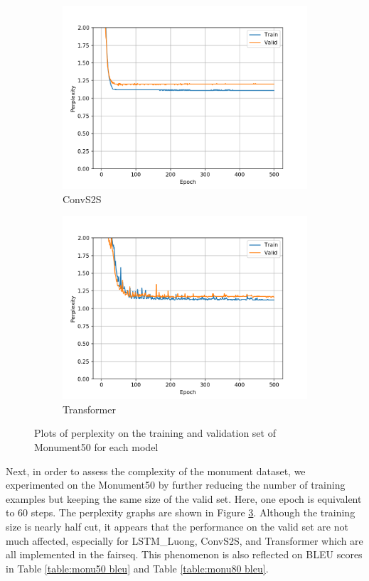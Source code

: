 \begin{figure}[h]
\begin{subfigure}{0.3\textwidth}
\includegraphics[width=\textwidth]{../results/monument2_2/run2/fconv_wmt_en_de/ppls.png} 
\caption{ConvS2S}
\label{fig:monu2 convs2s ppl}
\end{subfigure}
\hfill
\begin{subfigure}{0.3\textwidth}
\includegraphics[width=\textwidth]{../results/monument2_2/run1/transformer_iwslt_de_en/ppls.png}
\caption{Transformer}
\label{fig:monu2 transformer ppl}
\end{subfigure}
\hfill
\caption{Plots of perplexity on the training and validation set of Monument50 for each model}
\label{fig:monu2 ppls}
\end{figure}

Next, in order to assess the complexity of the monument dataset, we experimented on the Monument50 by further reducing the number of training examples but keeping the same size of the valid set. Here, one epoch is equivalent to 60 steps. The perplexity graphs are shown in Figure \ref{fig:monu2 ppls}. Although the training size is nearly half cut, it appears that the performance on the valid set are not much affected, especially for LSTM\_Luong, ConvS2S, and Transformer which are all implemented in the fairseq. This phenomenon is also reflected on BLEU scores in Table \ref{table:monu50 bleu} and Table \ref{table:monu80 bleu}.  


